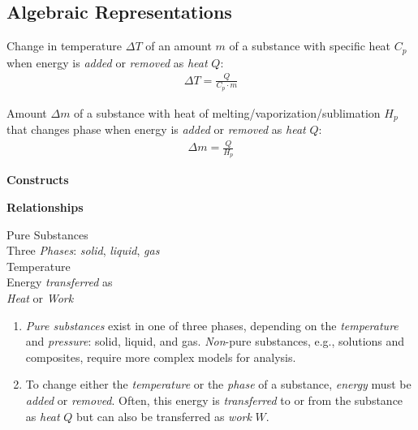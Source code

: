 \subsection*{Algebraic Representations}

\noindent Change in temperature $\Delta T$ of an amount $m$ of a substance with specific heat $C_p$ when energy is \emph{added} or \emph{removed} as \emph{heat} $Q$:
\begin{align*}
	\Delta T = \frac{Q}{C_p \cdot m}
\end{align*}

\noindent Amount $\Delta m$ of a substance with heat of melting/vaporization/sublimation $H_p$ that changes phase when energy is \emph{added} or \emph{removed} as \emph{heat} $Q$:
\begin{align*}
	\Delta m = \frac{Q}{H_p}
\end{align*}


\pagebreak


\newcommand{\leftcolumn}{0.35\linewidth}
\newcommand{\rightcolumn}{0.65\linewidth}

\noindent
\parbox[b]{\leftcolumn}{
	\textbf{Constructs}}
\parbox[b]{\rightcolumn}{
	\textbf{Relationships}}

\noindent
\hrulefill

\noindent
\begin{minipage}[c]{\leftcolumn}
	\baselineskip
	Pure Substances\\
	Three \emph{Phases}: \emph{solid}, \emph{liquid}, \emph{gas}\\
	Temperature\\
	Energy \emph{transferred} as\\
	\hspace*{5mm}\emph{Heat} or \emph{Work}
\end{minipage}
\begin{minipage}[c]{\rightcolumn}
	\begin{enumerate}
		\item {\em Pure substances} exist in one of three phases, depending on the \emph{temperature} and \emph{pressure}: solid, liquid, and gas. {\em Non}-pure substances, e.g., solutions and composites, require more complex models for analysis.
		\item To change either the \emph{temperature} or the \emph{phase} of a substance, \emph{energy} must be \emph{added} or \emph{removed}. Often, this energy is \emph{transferred} to or from the substance as \emph{heat} $Q$ but can also be transferred as \emph{work} $W$.\\[0.2mm]
	\end{enumerate}
\end{minipage}

